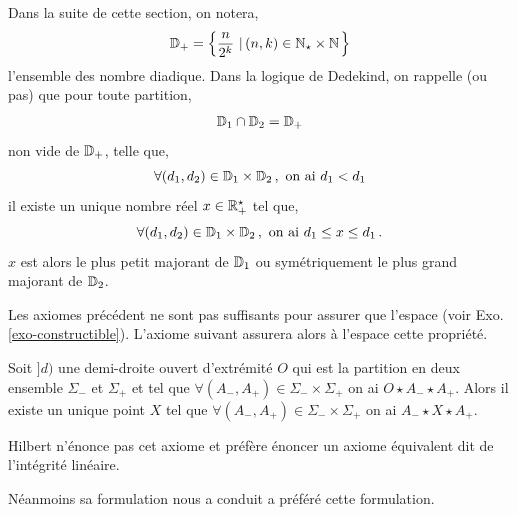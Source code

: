Dans la suite de cette section, on notera,
\begin{equation*}
    \mathbb{D}_+ = \left\{\dfrac{n}{2^k}\,\left|\,(n,k)\in \mathbb{N}_\star\times\mathbb{N} \right.\right\}
\end{equation*}
l'ensemble des nombre diadique. Dans la logique de Dedekind, on rappelle (ou pas) que pour toute partition,
\begin{equation*}
    \mathbb{D}_1 \cap \mathbb{D}_2 = \mathbb{D}_+ 
\end{equation*}
non vide de $\mathbb{D}_+$, telle que,
\begin{equation*}
    \forall (d_1,d_2)\in \mathbb{D}_1 \times \mathbb{D}_2\,, \text{ on ai } d_1 < d_1
\end{equation*}
il existe un unique nombre réel $x\in \mathbb{R}_+^\star$ tel que,
\begin{equation*}
    \forall (d_1,d_2)\in \mathbb{D}_1 \times \mathbb{D}_2\,, \text{ on ai } d_1 \leq x \leq d_1\,.
\end{equation*}
$x$ est alors le plus petit majorant de $\mathbb{D}_1$ ou symétriquement le plus grand majorant de $\mathbb{D}_2$. 

Les axiomes précédent ne sont pas suffisants pour assurer que l'espace  (voir Exo. \ref{exo-constructible}). L'axiome suivant assurera alors à l'espace cette propriété. 
\begin{axi}[Dedekind]\label{axi-dedekind}
    Soit $]d)$ une demi-droite ouvert d'extrémité $O$ qui est la partition en deux ensemble $\Sigma_-$ et $\Sigma_+$ et tel que $\forall (A_-,A_+)\in \Sigma_-\times \Sigma_+$ on ai $O\star A_- \star A_+$. Alors il existe un unique point $X$ tel que $\forall (A_-,A_+)\in \Sigma_-\times \Sigma_+$ on ai $ A_- \star X \star A_+$.
\end{axi}
Hilbert n'énonce pas cet axiome et préfère énoncer un axiome équivalent dit de l'intégrité linéaire. 

Néanmoins sa formulation  nous a conduit a préféré cette formulation. 

